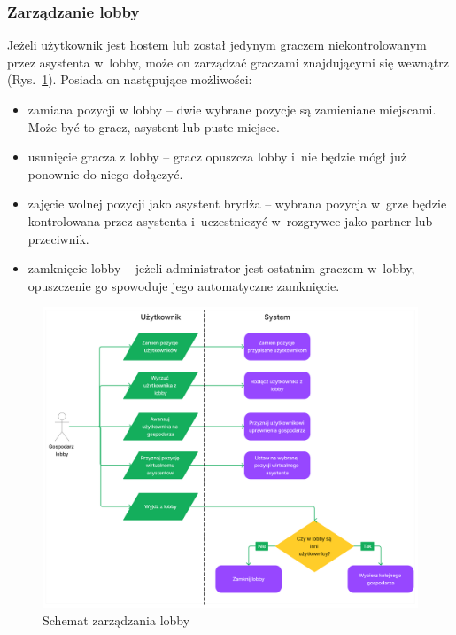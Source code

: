 \FloatBarrier

\subsubsection{Zarządzanie lobby}

Jeżeli użytkownik jest hostem lub został jedynym
graczem niekontrolowanym przez asystenta w~lobby, może on zarządzać graczami
znajdującymi się
wewnątrz (Rys.~\ref{fig:schemat_manage_lobby}). Posiada on następujące możliwości:
\begin{itemize}
  \item zamiana pozycji w lobby -- dwie wybrane pozycje są zamieniane miejscami.
        Może być to gracz, asystent lub puste miejsce.
  \item usunięcie gracza z lobby -- gracz opuszcza lobby i~nie będzie
        mógł już ponownie do niego dołączyć.
  \item zajęcie wolnej pozycji jako asystent brydża -- wybrana pozycja
        w~grze będzie kontrolowana przez asystenta
        i~uczestniczyć w~rozgrywce jako partner lub przeciwnik.
  \item zamknięcie lobby -- jeżeli administrator jest ostatnim
        graczem w~lobby, opuszczenie go spowoduje jego automatyczne
        zamknięcie.

\end{itemize}

\begin{figure}[h]
  \centering
  \includegraphics[width=\textwidth]{img/schematy/manage_lobby.png}
  \caption{Schemat zarządzania lobby}
  \label{fig:schemat_manage_lobby}
\end{figure}

